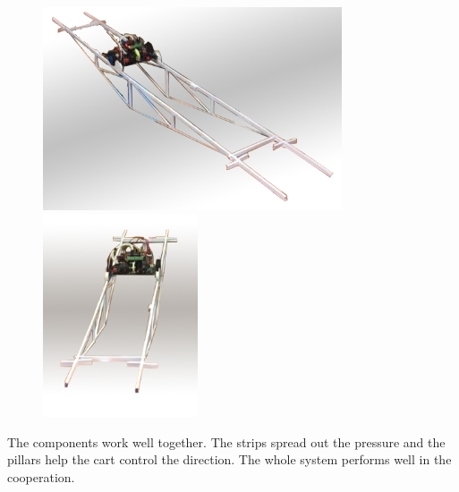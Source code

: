 \begin{figure}[H]
\begin{center}
\includegraphics[height=6cm]{figure/designOverview/overallll}
\includegraphics[height=6cm]{figure/designOverview/overallb}
\end{center}
\end{figure}

The components work well together. The strips spread out the pressure and the pillars help the cart control the direction. The whole system performs well in the cooperation.
		